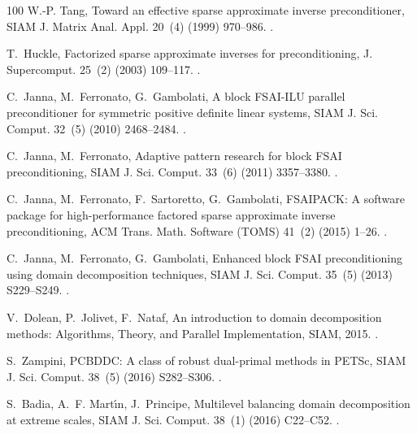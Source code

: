 \documentclass[3p,times]{elsarticle}
\theoremstyle{plain}
\begin{document}
\begin{thebibliography}{100}
W.-P. Tang, {Toward an effective sparse approximate inverse preconditioner},
  SIAM J. Matrix Anal. Appl. 20~(4) (1999) 970--986.
\newblock \href {https://doi.org/10.1137/S0895479897320071}
  {}.

T.~Huckle, {Factorized sparse approximate inverses for preconditioning}, J.
  Supercomput. 25~(2) (2003) 109--117.
\newblock \href {https://doi.org/10.1023/A:1023988426844}
  {}.

C.~Janna, M.~Ferronato, G.~Gambolati, {A block FSAI-ILU parallel preconditioner
  for symmetric positive definite linear systems}, SIAM J. Sci. Comput. 32~(5)
  (2010) 2468--2484.
\newblock \href {https://doi.org/10.1137/090779760}
  {}.

C.~Janna, M.~Ferronato, {Adaptive pattern research for block FSAI
  preconditioning}, SIAM J. Sci. Comput. 33~(6) (2011) 3357--3380.
\newblock \href {https://doi.org/10.1137/100810368}
  {}.

C.~Janna, M.~Ferronato, F.~Sartoretto, G.~Gambolati, {FSAIPACK: A software
  package for high-performance factored sparse approximate inverse
  preconditioning}, ACM Trans. Math. Software (TOMS) 41~(2) (2015) 1--26.
\newblock \href {https://doi.org/10.1145/2629475} {}.

C.~Janna, M.~Ferronato, G.~Gambolati, {Enhanced block FSAI preconditioning
  using domain decomposition techniques}, SIAM J. Sci. Comput. 35~(5) (2013)
  S229--S249.
\newblock \href {https://doi.org/10.1137/120880860}
  {}.

V.~Dolean, P.~Jolivet, F.~Nataf, {An introduction to domain decomposition
  methods: Algorithms, Theory, and Parallel Implementation}, SIAM, 2015.
\newblock \href {https://doi.org/10.1137/1.9781611974065}
  {}.

S.~Zampini, {PCBDDC: A class of robust dual-primal methods in PETSc}, SIAM J.
  Sci. Comput. 38~(5) (2016) S282--S306.
\newblock \href {https://doi.org/10.1137/15M1025785}
  {}.

S.~Badia, A.~F. Mart{\'\i}n, J.~Principe, {Multilevel balancing domain
  decomposition at extreme scales}, SIAM J. Sci. Comput. 38~(1) (2016)
  C22--C52.
\newblock \href {https://doi.org/10.1137/15M1013511}
  {}.


\end{thebibliography}
\end{document}
